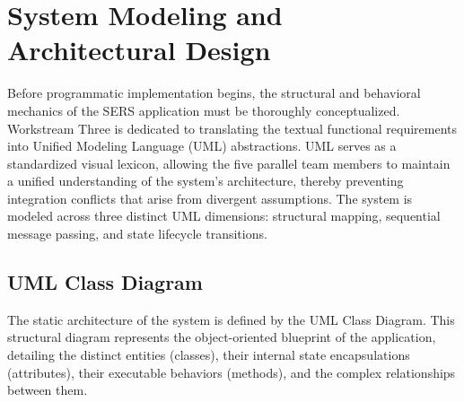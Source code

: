\section{System Modeling and Architectural Design}

Before programmatic implementation begins, the structural and behavioral mechanics of the SERS application must be thoroughly conceptualized. Workstream Three is dedicated to translating the textual functional requirements into Unified Modeling Language (UML) abstractions. UML serves as a standardized visual lexicon, allowing the five parallel team members to maintain a unified understanding of the system's architecture, thereby preventing integration conflicts that arise from divergent assumptions. The system is modeled across three distinct UML dimensions: structural mapping, sequential message passing, and state lifecycle transitions.

\subsection{UML Class Diagram}

The static architecture of the system is defined by the UML Class Diagram. This structural diagram represents the object-oriented blueprint of the application, detailing the distinct entities (classes), their internal state encapsulations (attributes), their executable behaviors (methods), and the complex relationships between them.

